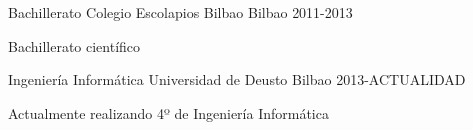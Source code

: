 


\begin{cventries}


\cventry
{Bachillerato} %
{Colegio Escolapios Bilbao} %
{Bilbao} %
{2011-2013} %
{ %
\begin{cvitems}
\item {Bachillerato científico }
\end{cvitems}
}

\cventry
{Ingeniería Informática} %
{Universidad de Deusto} %
{Bilbao} %
{2013-ACTUALIDAD} %
{ %
\begin{cvitems}
\item {Actualmente realizando 4º de Ingeniería Informática}
\end{cvitems}
}


\end{cventries}